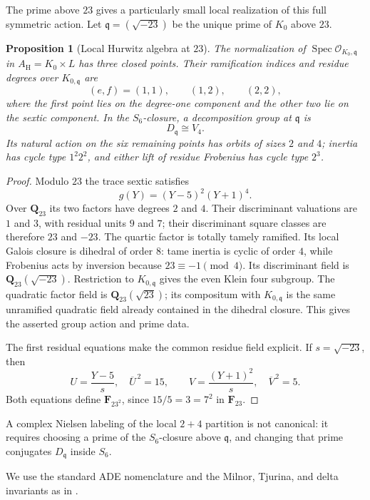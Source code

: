 \documentclass[11pt]{amsart}
\newtheorem{proposition}[proposition]{Proposition}
\theoremstyle{definition}
\theoremstyle{remark}
\newcommand{\QQ}{\mathbf Q}
\newcommand{\FF}{\mathbf F}
\begin{document}
The prime above $23$ gives a particularly small local realization of this
full symmetric action.  Let $\mathfrak q=(\sqrt{-23})$ be the unique prime of
$K_0$ above $23$.

\begin{proposition}[Local Hurwitz algebra at $23$]
\label{prop:hurwitz-local-23}
The normalization of $\operatorname{Spec}\mathcal O_{K_0,\mathfrak q}$ in
$A_{\mathrm H}=K_0\times L$ has three closed points.  Their ramification
indices and residue degrees over $K_{0,\mathfrak q}$ are
\[
 (e,f)=(1,1),\qquad(1,2),\qquad(2,2),
\]
where the first point lies on the degree-one component and the other two lie on
the sextic component.  In the $S_6$-closure, a decomposition group at
$\mathfrak q$ is
\[
 D_{\mathfrak q}\cong V_4.
\]
Its natural action on the six remaining points has orbits of sizes $2$
and $4$; inertia has cycle type $1^2 2^2$, and either lift of residue
Frobenius has cycle type $2^3$.
\end{proposition}

\begin{proof}
Modulo $23$ the trace sextic satisfies
\[
 g(Y)=(Y-5)^2(Y+1)^4.
\]
Over $\QQ_{23}$ its two factors have degrees $2$ and $4$.  Their
discriminant valuations are $1$ and $3$, with residual units $9$ and $7$;
their discriminant square classes are therefore $23$ and $-23$.
The quartic factor is totally tamely ramified.  Its local Galois closure is
dihedral of order $8$: tame inertia is cyclic of order $4$, while Frobenius
acts by inversion because $23\equiv-1\pmod4$.  Its discriminant field is
$\QQ_{23}(\sqrt{-23})$.  Restriction to $K_{0,\mathfrak q}$ gives the even
Klein four subgroup.  The quadratic factor field is
$\QQ_{23}(\sqrt{23})$; its compositum with $K_{0,\mathfrak q}$ is the same
unramified quadratic field already contained in the dihedral closure.
This gives the asserted group action and prime data.

The first residual equations make the common residue field explicit.  If
$s=\sqrt{-23}$, then
\[
 U=\frac{Y-5}{s},\quad \overline U^{\,2}=15,
 \qquad
 V=\frac{(Y+1)^2}{s},\quad \overline V^{\,2}=5.
\]
Both equations define $\FF_{23^2}$, since $15/5=3=7^2$ in $\FF_{23}$.
\end{proof}

A complex Nielsen labeling of the local $2+4$ partition is not canonical:
it requires choosing a prime of the $S_6$-closure above $\mathfrak q$, and
changing that prime conjugates $D_{\mathfrak q}$ inside $S_6$.

We use the standard ADE nomenclature and the Milnor, Tjurina, and delta
invariants as in \cite{GLS}.
\end{document}

